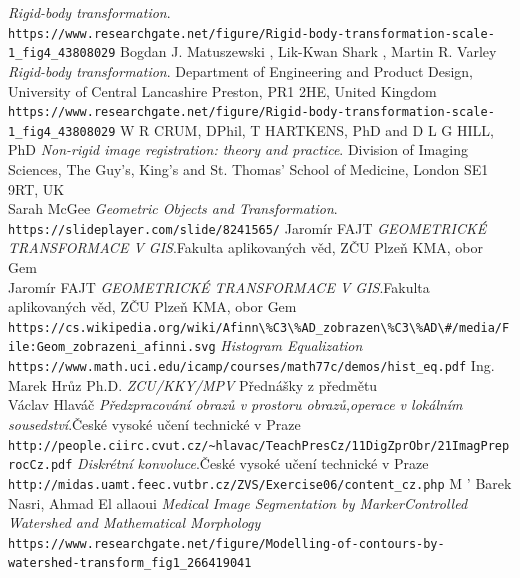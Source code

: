 \documentclass{thesis}%
\begin{document}
\begin{thebibliography}{DUSO}
    
    \emph{Rigid-body transformation}.\\
    \verb|https://www.researchgate.net/figure/Rigid-body-transformation-scale-1_fig4_43808029|
 Bogdan J. Matuszewski , Lik-Kwan Shark , Martin R. Varley
    \emph{Rigid-body transformation}. Department of Engineering and Product Design, University of Central Lancashire Preston, PR1 2HE, United Kingdom\\
    \verb|https://www.researchgate.net/figure/Rigid-body-transformation-scale-1_fig4_43808029|
W R CRUM, DPhil, T HARTKENS, PhD and D L G HILL, PhD
    \emph{Non-rigid image registration: theory and practice}. Division of Imaging Sciences, The Guy’s, King’s and St. Thomas’ School of Medicine, London SE1 9RT, UK\\
Sarah McGee
    \emph{Geometric Objects and Transformation}.\\
    \verb|https://slideplayer.com/slide/8241565/|
Jaromír FAJT
    \emph{GEOMETRICKÉ TRANSFORMACE V GIS}.Fakulta aplikovaných věd, ZČU Plzeň KMA, obor Gem \\
Jaromír FAJT
    \emph{GEOMETRICKÉ TRANSFORMACE V GIS}.Fakulta aplikovaných věd, ZČU Plzeň KMA, obor Gem \\
    \verb|https://cs.wikipedia.org/wiki/Afinn\%C3\%AD_zobrazen\%C3\%AD\#/media/File:Geom_zobrazeni_afinni.svg|
    \emph{Histogram Equalization} \\
    \verb|https://www.math.uci.edu/icamp/courses/math77c/demos/hist_eq.pdf|
Ing. Marek Hrůz Ph.D.
    \emph{ZCU/KKY/MPV} Přednášky z předmětu\\
Václav Hlaváč
    \emph{Předzpracování obrazů v prostoru obrazů,operace v lokálním sousedství}.České vysoké učení technické v Praze \\
    \verb|http://people.ciirc.cvut.cz/~hlavac/TeachPresCz/11DigZprObr/21ImagPreprocCz.pdf|
    \emph{Diskrétní konvoluce}.České vysoké učení technické v Praze \\
    \verb|http://midas.uamt.feec.vutbr.cz/ZVS/Exercise06/content_cz.php|
M ' Barek Nasri, Ahmad El allaoui
    \emph{ Medical Image Segmentation by MarkerControlled Watershed and Mathematical Morphology} \\
    \verb|https://www.researchgate.net/figure/Modelling-of-contours-by-watershed-transform_fig1_266419041|    



\end{thebibliography}
  
%
\end{document}
